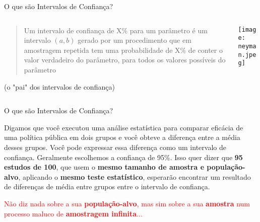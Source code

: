 \begin{frame}{O que são Intervalos de Confiança?}
	\begin{columns}
		\begin{column}{0.8\textwidth}
			\begin{defn}
				\begin{quotation}
					Um intervalo de confiança de X\% para um parâmetro é um intervalo
					$(a, b)$ gerado por um procedimento que em amostragem repetida
					tem uma probabilidade de X\% de conter o valor verdadeiro do
					parâmetro, para todos os valores possíveis do parâmetro
				\end{quotation}
				\vfill \vfill
				\textcite{neyman1937outline} (o "pai" dos intervalos de confiança)
			\end{defn}
		\end{column}
		\begin{column}{0.2\textwidth}
			\centering
			\texttt{[image: neyman.jpeg]}
		\end{column}
	\end{columns}
\end{frame}

\begin{frame}{O que são Intervalos de Confiança?}
	\begin{exemplo}
		Digamos que você executou uma análise estatística para comparar
		eficácia de uma política pública em dois grupos e você obteve a
		diferença entre a média desses grupos. Você pode expressar essa
		diferença como um intervalo de confiança. Geralmente escolhemos a
		confiança de 95\%. Isso quer dizer que \textbf{95 estudos de 100},
		que usem o \textbf{mesmo tamanho de amostra e população-alvo},
		aplicando o \textbf{mesmo teste estatístico}, esperarão encontrar
		um resultado de diferenças de média entre grupos entre o intervalo
		de confiança.
	\end{exemplo}
	\footnotesize \textcolor{red}{Não diz nada sobre a sua \textbf{população-alvo},
		mas sim sobre a sua \textbf{amostra} num processo maluco de \textbf{amostragem infinita}...}
\end{frame}


